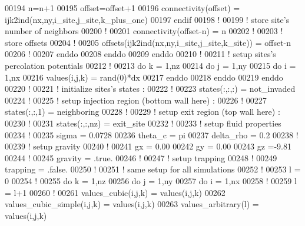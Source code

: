 \begin{DoxyCode}
00194             n=n+1
00195             offset=offset+1
00196             connectivity(offset) = ijk2ind(nx,ny,i\_site,j\_site,k\_plus\_one)
00197          \textcolor{keyword}{endif}
00198          \textcolor{comment}{!}
00199          \textcolor{comment}{! store site's number of neighbors}
00200          \textcolor{comment}{!}
00201          connectivity(offset-n) = n
00202          \textcolor{comment}{!}
00203          \textcolor{comment}{! store offsets}
00204          \textcolor{comment}{!}
00205          offsets(ijk2ind(nx,ny,i\_site,j\_site,k\_site)) = offset-n
00206          \textcolor{comment}{!}
00207       \textcolor{keyword}{enddo}
00208    \textcolor{keyword}{enddo}
00209 \textcolor{keyword}{enddo}
00210 \textcolor{comment}{!}
00211 \textcolor{comment}{! setup sites's percolation potentials}
00212 \textcolor{comment}{!}
00213 \textcolor{keyword}{do} k = 1,nz
00214    \textcolor{keyword}{do} j = 1,ny
00215       \textcolor{keyword}{do} i = 1,nx
00216          values(i,j,k) = rand(0)*dx
00217       \textcolor{keyword}{enddo}
00218    \textcolor{keyword}{enddo}
00219 \textcolor{keyword}{enddo}
00220 \textcolor{comment}{!}
00221 \textcolor{comment}{! initialize sites's states :}
00222 \textcolor{comment}{!}
00223 states(:,:,:) = not\_invaded
00224 \textcolor{comment}{!}
00225 \textcolor{comment}{! setup injection region (bottom wall here) :}
00226 \textcolor{comment}{!}
00227 states(:,:,1) = neighboring
00228 \textcolor{comment}{!}
00229 \textcolor{comment}{! setup exit region (top wall here) :}
00230 \textcolor{comment}{!}
00231 states(:,:,nz) = exit\_site
00232 \textcolor{comment}{!}
00233 \textcolor{comment}{! setup fluid properties}
00234 \textcolor{comment}{!}
00235 sigma = 0.0728
00236 theta\_c = pi
00237 delta\_rho  = 0.2
00238 \textcolor{comment}{!}
00239 \textcolor{comment}{! setup gravity}
00240 \textcolor{comment}{!}
00241 gx = 0.00
00242 gy = 0.00
00243 gz =-9.81
00244 \textcolor{comment}{!}
00245 gravity = .true.
00246 \textcolor{comment}{!}
00247 \textcolor{comment}{! setup trapping}
00248 \textcolor{comment}{!}
00249 trapping = .false.
00250 \textcolor{comment}{!}
00251 \textcolor{comment}{! same setup for all simulations}
00252 \textcolor{comment}{!}
00253 l = 0
00254 \textcolor{comment}{!}
00255 \textcolor{keyword}{do} k = 1,nz
00256    \textcolor{keyword}{do} j = 1,ny
00257       \textcolor{keyword}{do} i = 1,nx
00258          \textcolor{comment}{!}
00259          l = l+1
00260          \textcolor{comment}{!}
00261          values\_cubic(i,j,k) = values(i,j,k)
00262          values\_cubic\_simple(i,j,k) = values(i,j,k)
00263          values\_arbitrary(l) = values(i,j,k)

\end{DoxyCode}
